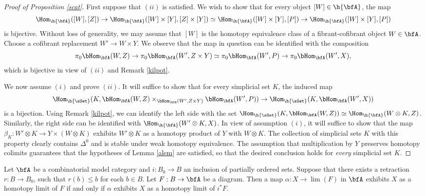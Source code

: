 \begin{proof}[Proof of Proposition \ref{scat}]
First suppose that $(ii)$ is satisfied. We wish to show that for every object
$[W] \in \h{\bfA}$, the map
$$ \Hom_{\h{\bfA}}( [W], [Z] ) \rightarrow
\Hom_{ \h{\bfA} }( [W] \times [Y], [Z] \times [Y])
\simeq \Hom_{ \h{\bfA}}( [W] \times [Y], [P] ) \rightarrow \Hom_{\h{\bfA}}( [W] \times [Y], [P] )$$
is bijective. Without loss of generality, we may assume that $[W]$ is the homotopy equivalence class
of a fibrant-cofibrant object $W \in \bfA$. Choose a cofibrant replacement $W' \rightarrow W \times Y$.
We observe that the map in question can be identified with the composition
$$ \pi_0 \bHom_{ \bfA}( W, Z) \rightarrow \pi_0 \bHom_{ \bfA}( W', Z \times Y)
\simeq \pi_0 \bHom_{\bfA}( W', P) \rightarrow \pi_0 \bHom_{\bfA}( W',X),$$
which is bijective in view of $(ii)$ and Remark \ref{kilpot}.

We now assume $(i)$ and prove $(ii)$. It will suffice to show that for every simplicial
set $K$, the induced map
$$\Hom_{\h{\sSet}}( K, \bHom_{\bfA}(W,Z) \times_{ \bHom_{\bfA}( W', Z \times Y) } \bHom_{\bfA}(W', P)
) \rightarrow \Hom_{\h{\sSet}}(K, \bHom_{\bfA}(W',X) )$$
is a bijection. Using Remark \ref{kilpot}, we can identify the left side with the
set $\Hom_{\h{\sSet}}(K, \bHom_{\bfA}(W,Z)) \simeq \Hom_{\h{\bfA}}( W \otimes K, Z)$.
Similarly, the right side can be identified with $\Hom_{\h{\bfA}}( W' \otimes K, X)$.
In view of assumption $(i)$, it will suffice to show that the map
$\beta_{K}: W' \otimes K \rightarrow Y \times (W \otimes K)$
exhibits $W' \otimes K$ as a homotopy product of $Y$ with $W \otimes K$.
The collection of simplicial sets $K$ with this property clearly contains
$\Delta^0$ and is stable under weak homotopy equivalence. The assumption
that multiplication by $Y$ preserves homotopy colimits guarantees that the hypotheses of
Lemma \ref{alem} are satisfied, so that the desired conclusion holds for {\em every} simplicial set $K$.
\end{proof}

\begin{lemma}\label{tukka}
Let $\bfA$ be a combinatorial model category and $i: B_0 \rightarrow B$
an inclusion of partially ordered sets. Suppose that there exists a retraction
$r: B \rightarrow B_0$, such that $r(b) \leq b$ for each $b \in B$.
Let $F: B \rightarrow \bfA$ be a diagram. Then a map
$\alpha: X \rightarrow \lim(F)$ in $\bfA$ exhibits $X$ as a homotopy limit of
$F$ if and only if $\alpha$ exhibits $X$ as a homotopy limit of $i^{\ast} F$.
\end{lemma}

